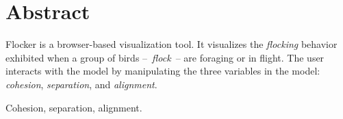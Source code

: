 \documentclass[../main]{subfiles}
\begin{document}
\section{Abstract}
Flocker is a browser-based visualization tool. It visualizes the {\em flocking} behavior exhibited when
a group of birds --~{\em flock}~-- are foraging or in flight. The user interacts with the model by
manipulating the three variables in the model: {\em cohesion}, {\em separation}, and {\em alignment}.

\begin{IEEEkeywords}
    Cohesion, separation, alignment.
\end{IEEEkeywords}
\end{document}
